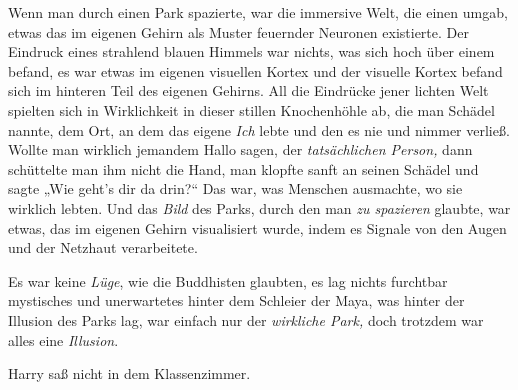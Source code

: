Wenn man durch einen Park spazierte, war die immersive Welt, die einen umgab, etwas das im eigenen Gehirn als Muster feuernder Neuronen existierte. Der Eindruck eines strahlend blauen Himmels war nichts, was sich hoch über einem befand, es war etwas im eigenen visuellen Kortex und der visuelle Kortex befand sich im hinteren Teil des eigenen Gehirns. All die Eindrücke jener lichten Welt spielten sich in Wirklichkeit in dieser stillen Knochenhöhle ab, die man Schädel nannte, dem Ort, an dem das eigene \emph{Ich} lebte und den es nie und nimmer verließ. Wollte man wirklich jemandem Hallo sagen, der \emph{tatsächlichen Person,} dann schüttelte man ihm nicht die Hand, man klopfte sanft an seinen Schädel und sagte „Wie geht's dir da drin?“ Das war, was Menschen ausmachte, wo sie wirklich lebten. Und das \emph{Bild} des Parks, durch den man \emph{zu spazieren} glaubte, war etwas, das im eigenen Gehirn visualisiert wurde, indem es Signale von den Augen und der Netzhaut verarbeitete.

Es war keine \emph{Lüge}, wie die Buddhisten glaubten, es lag nichts furchtbar mystisches und unerwartetes hinter dem Schleier der Maya, was hinter der Illusion des Parks lag, war einfach nur der \emph{wirkliche Park,} doch trotzdem war alles eine \emph{Illusion}.

Harry saß nicht in dem Klassenzimmer.


